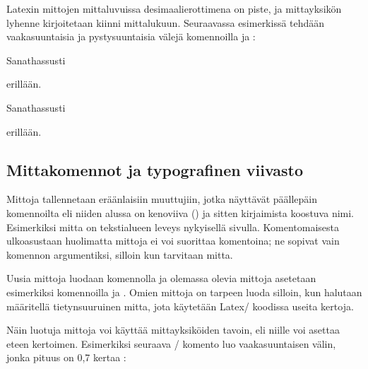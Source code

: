 Latexin mittojen mittaluvuissa desimaalierottimena on piste, ja
mittayksikön lyhenne kirjoitetaan kiinni mittalukuun. Seuraavassa
esimerkissä tehdään vaakasuuntaisia ja pystysuuntaisia välejä
komennoilla  ja :

\begin{koodilohkosis}
Sanat\hspace{1.2cm}hassusti
\vspace{2mm}

\hspace{1.75em}erillään.
\end{koodilohkosis}

\begin{tulossis}
  Sanat\hspace{1.2cm}hassusti  \nopagebreak
  \vspace{2mm}

  \hspace{1.75em}erillään.
\end{tulossis}

\subsection{Mittakomennot ja typografinen viivasto}

Mittoja tallennetaan eräänlaisiin muuttujiin, jotka näyttävät päällepäin
komennoilta eli niiden alussa on kenoviiva (\koodi{\keno}) ja sitten
kirjaimista koostuva nimi. Esimerkiksi mitta  on
tekstialueen leveys nykyisellä sivulla. Komentomaisesta ulkoasustaan
huolimatta mittoja ei voi suorittaa komentoina; ne sopivat vain komennon
argumentiksi, silloin kun tarvitaan mitta.

Uusia mittoja luodaan komennolla  ja olemassa olevia
mittoja asetetaan esimerkiksi komennoilla  ja
. Omien mittoja on tarpeen luoda silloin, kun
halutaan määritellä tietynsuuruinen mitta, jota käytetään Latex\-/
koodissa useita kertoja.

\begin{koodilohkosis}
\newlength{\omamitta}         %
\setlength{\omamitta}{2.3em}  %
\addtolength{\omamitta}{1em}  %
\addtolength{\omamitta}{-1em} %
\end{koodilohkosis}

\noindent
Näin luotuja mittoja voi käyttää mittayksiköiden tavoin, eli niille voi
asettaa eteen kertoimen. Esimerkiksi seuraava \-/
komento luo vaakasuuntaisen välin, jonka pituus on 0,7 kertaa
:

